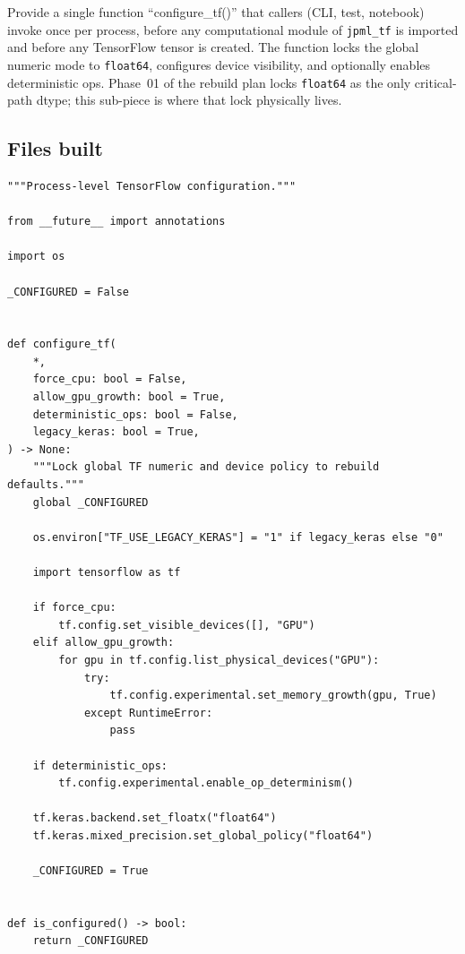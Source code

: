 \documentclass[11pt]{report}
\begin{document}
Provide a single function ``configure\_tf()'' that callers (CLI, test,
notebook) invoke once per process, before any computational module of
\texttt{jpml\_tf} is imported and before any TensorFlow tensor is
created. The function locks the global numeric mode to \texttt{float64},
configures device visibility, and optionally enables deterministic ops.
Phase~01 of the rebuild plan locks \texttt{float64} as the only
critical-path dtype; this sub-piece is where that lock physically lives.

\subsection*{Files built}

\begin{lstlisting}[style=python, caption={\texttt{code\_clean/jpml\_tf/startup.py}}]
"""Process-level TensorFlow configuration."""

from __future__ import annotations

import os

_CONFIGURED = False


def configure_tf(
    *,
    force_cpu: bool = False,
    allow_gpu_growth: bool = True,
    deterministic_ops: bool = False,
    legacy_keras: bool = True,
) -> None:
    """Lock global TF numeric and device policy to rebuild defaults."""
    global _CONFIGURED

    os.environ["TF_USE_LEGACY_KERAS"] = "1" if legacy_keras else "0"

    import tensorflow as tf

    if force_cpu:
        tf.config.set_visible_devices([], "GPU")
    elif allow_gpu_growth:
        for gpu in tf.config.list_physical_devices("GPU"):
            try:
                tf.config.experimental.set_memory_growth(gpu, True)
            except RuntimeError:
                pass

    if deterministic_ops:
        tf.config.experimental.enable_op_determinism()

    tf.keras.backend.set_floatx("float64")
    tf.keras.mixed_precision.set_global_policy("float64")

    _CONFIGURED = True


def is_configured() -> bool:
    return _CONFIGURED
\end{lstlisting}
\end{document}
